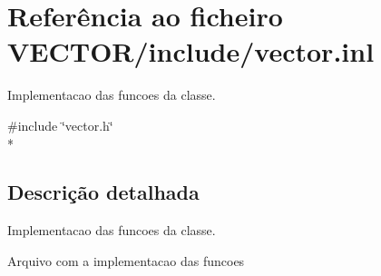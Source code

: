 \hypertarget{vector_8inl}{}\section{Referência ao ficheiro V\+E\+C\+T\+O\+R/include/vector.inl}
\label{vector_8inl}


Implementacao das funcoes da classe.  


{\ttfamily \#include \char`\"{}vector.\+h\char`\"{}}\\*


\subsection{Descrição detalhada}
Implementacao das funcoes da classe. 

Arquivo com a implementacao das funcoes 